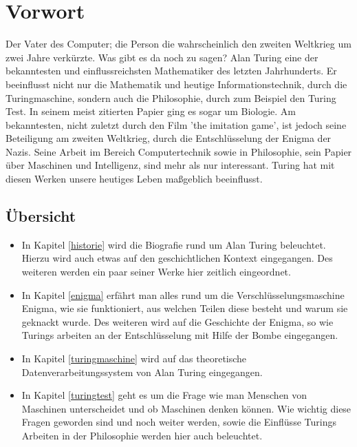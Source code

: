 \section{Vorwort}
Der Vater des Computer; die Person die wahrscheinlich den zweiten Weltkrieg um zwei Jahre verkürzte. Was gibt es da noch zu sagen? Alan Turing eine der bekanntesten und einflussreichsten Mathematiker des letzten Jahrhunderts. Er beeinflusst nicht nur die Mathematik und heutige Informationstechnik, durch die Turingmaschine, sondern auch die Philosophie, durch zum Beispiel den Turing Test. In seinem meist zitierten Papier ging es sogar um Biologie. Am bekanntesten, nicht zuletzt durch den Film 'the imitation game', ist jedoch seine Beteiligung am zweiten Weltkrieg, durch die Entschlüsselung der Enigma der Nazis. Seine Arbeit im Bereich Computertechnik sowie in Philosophie, sein Papier über Maschinen und Intelligenz, sind mehr als nur interessant. Turing hat mit diesen Werken unsere heutiges Leben maßgeblich beeinflusst.

\subsection{Übersicht}
\begin{itemize}
\item In Kapitel \ref{historie} wird die Biografie rund um Alan Turing beleuchtet. Hierzu wird auch etwas auf den geschichtlichen Kontext eingegangen. Des weiteren werden ein paar seiner Werke hier zeitlich eingeordnet.
\item In Kapitel \ref{enigma} erfährt man alles rund um die Verschlüsselungsmaschine Enigma, wie sie funktioniert, aus welchen Teilen diese besteht und warum sie geknackt wurde. Des weiteren wird auf die Geschichte der Enigma, so wie Turings arbeiten an der Entschlüsselung mit Hilfe der Bombe eingegangen.
\item In Kapitel \ref{turingmaschine} wird auf das theoretische Datenverarbeitungssystem von Alan Turing eingegangen.
\item In Kapitel \ref{turingtest} geht es um die Frage wie man Menschen von Maschinen unterscheidet und ob Maschinen denken können. Wie wichtig diese Fragen geworden sind und noch weiter werden, sowie die Einflüsse Turings Arbeiten in der Philosophie werden hier auch beleuchtet.
\end{itemize}